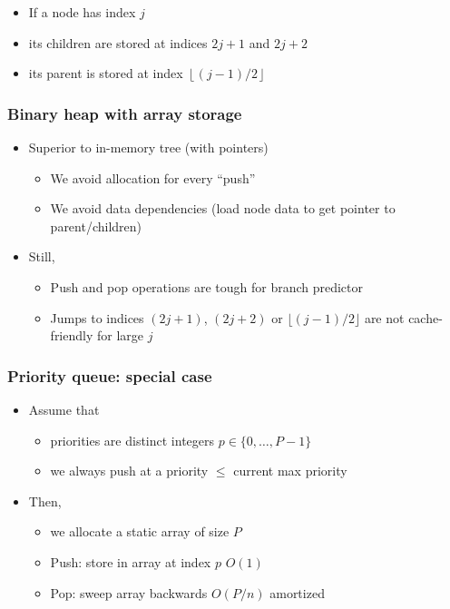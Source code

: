 \documentclass[12pt]{article}
\begin{document}
\begin{itemize}
  \item If a node has index \( j \)
  \item its children are stored at indices \( 2j + 1 \) and \( 2j + 2 \)
  \item its parent is stored at index \( \left\lfloor (j - 1) / 2 \right\rfloor \)
\end{itemize}

\subsubsection{Binary heap with array storage}

\begin{itemize}
    \item Superior to in-memory tree (with pointers)
    \begin{itemize}
        \item We avoid allocation for every ``push''
        \item We avoid data dependencies (load node data to get pointer to parent/children)
    \end{itemize}
    \item Still,
    \begin{itemize}
        \item Push and pop operations are tough for branch predictor
        \item Jumps to indices $(2j + 1)$, $(2j + 2)$ or $\lfloor (j - 1) / 2 \rfloor$ are not cache-friendly for large $j$
    \end{itemize}
\end{itemize}


\subsubsection{Priority queue: special case}

\begin{itemize}
    \item Assume that
    \begin{itemize}
        \item priorities are distinct integers $p \in \{0, \ldots, P - 1\}$
        \item we always push at a priority $\leq$ current max priority
    \end{itemize}
    \item Then,
    \begin{itemize}
        \item we allocate a static array of size $P$
        \item Push: store in array at index $p$ \quad $O(1)$
        \item Pop: sweep array backwards \quad $O(P / n)$ amortized
    \end{itemize}
\end{itemize}
\end{document}
